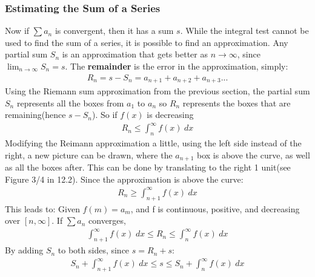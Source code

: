 \documentclass{article}
\begin{document}
\subsubsection{Estimating the Sum of a Series}
Now if $\sum a_n$ is convergent, then it has a sum $s$. While the integral test cannot be used to find the sum of a series, it is possible to find an approximation. Any partial sum $S_n$ is an approximation that gets better as $n \to \infty$, since $\lim_{n \to \infty} S_n = s$. The \textbf{remainder} is the error in the approximation, simply:
\begin{gather*}
    R_n = s - S_n = a_{n+1} + a_{n+2} + a_{n+3}...
\end{gather*}
Using the Riemann sum approximation from the previous section, the partial sum $S_n$ represents all the boxes from $a_1$ to $a_n$ so $R_n$ represents the boxes that are remaining(hence $s - S_n$). So if $f(x)$ is decreasing
\begin{gather*}
    R_n \leqslant \int_n^\infty f(x)\hspace{3pt}dx
\end{gather*}
Modifying the Reimann approximation a little, using the left side instead of the right, a new picture can be drawn, where the $a_{n+1}$ box is above the curve, as well as all the boxes after. This can be done by translating to the right 1 unit(see Figure 3/4 in 12.2). Since the approximation is above the curve:
\begin{gather*}
    R_n \geqslant \int_{n+1}^\infty f(x)\hspace{3pt}dx
\end{gather*}
This leads to: Given $f(m) = a_m$, and f is continuous, positive, and decreasing over $[n,\infty]$. If $\sum a_n$ converges,
\begin{gather*}
     \int_{n+1}^\infty f(x)\hspace{3pt}dx \leqslant R_n \leqslant \int_n^\infty f(x)\hspace{3pt}dx
\end{gather*}
By adding $S_n$ to both sides, since $s = R_n + s$:
\begin{gather*}
    S_n + \int_{n+1}^\infty f(x)\hspace{3pt}dx \leqslant s \leqslant S_n + \int_n^\infty f(x)\hspace{3pt}dx
\end{gather*}
\end{document}
